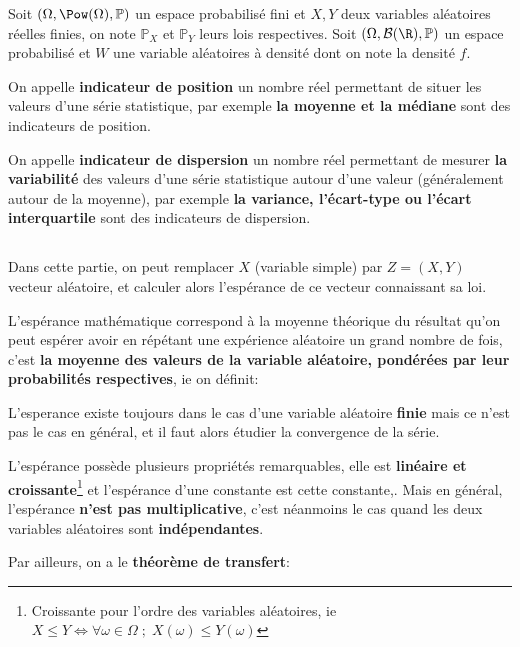 Soit \((\Omega, \Pow(\Omega), \mathbb{P})\) un espace probabilisé fini et \(X, Y\) deux variables aléatoires réelles finies, on note \(\mathbb{P}_X\) et \(\mathbb{P}_Y\) leurs lois respectives. \+
Soit \((\Omega, \mathcal{B}(\R), \mathbb{P})\) un espace probabilisé et \(W\) une variable aléatoires à densité dont on note la densité \(f\). \<

On appelle \textbf{indicateur de position} un nombre réel permettant de situer les valeurs d'une série statistique, par exemple \textbf{la moyenne et la médiane} sont des indicateurs de position.\<

On appelle \textbf{indicateur de dispersion} un nombre réel permettant de mesurer \textbf{la variabilité} des valeurs d'une série statistique autour d'une valeur (généralement autour de la moyenne), par exemple \textbf{la variance, l'écart-type ou l'écart interquartile} sont des indicateurs de dispersion.

\subsection*{}
Dans cette partie, on peut remplacer \(X\) (variable simple) par \(Z = (X, Y)\) vecteur aléatoire, et calculer alors l'espérance de ce vecteur connaissant sa loi.\<

L'espérance mathématique correspond à la moyenne théorique du résultat qu'on peut espérer avoir en répétant une expérience aléatoire un grand nombre de fois, c'est \textbf{la moyenne des valeurs de la variable aléatoire, pondérées par leur probabilités respectives}, ie on définit:

L'esperance existe toujours dans le cas d'une variable aléatoire \textbf{finie} mais ce n'est pas le cas en général, et il faut alors étudier la convergence de la série. \<

L'espérance possède plusieurs propriétés remarquables, elle est \textbf{linéaire et croissante}\footnote[1]{Croissante pour l'ordre des variables aléatoires, ie \(X \leq Y \Longleftrightarrow \forall \omega \in \Omega \; ; \; X(\omega) \leq Y(\omega)\)} et l'espérance d'une constante est cette constante,.\+
Mais en général, l'espérance \textbf{n'est pas multiplicative}, c'est néanmoins le cas quand les deux variables aléatoires sont \textbf{indépendantes}.\<

Par ailleurs, on a le \textbf{théorème de transfert}:


